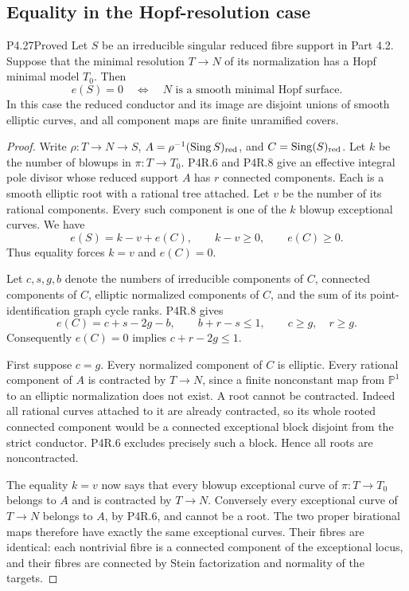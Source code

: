 \subsection{Equality in the Hopf-resolution case}

\begin{statement}{P4.27}{Proved}
Let \(S\) be an irreducible singular reduced fibre support in Part 4.2.
Suppose that the minimal resolution \(T\to N\) of its normalization has a
Hopf minimal model \(T_0\). Then
\[
 e(S)=0\quad\Longleftrightarrow\quad
 N\text{ is a smooth minimal Hopf surface}.
\]
In this case the reduced conductor and its image are disjoint unions of
smooth elliptic curves, and all component maps are finite unramified covers.
\end{statement}
\begin{proof}
Write \(\rho:T\to N\to S\), \(A=\rho^{-1}(\operatorname{Sing}S)_{\rm red}\),
and \(C=\operatorname{Sing}(S)_{\rm red}\). Let \(k\) be the number of
blowups in \(\pi:T\to T_0\). P4R.6 and P4R.8 give an effective integral pole
divisor whose reduced support \(A\) has \(r\) connected components. Each is
a smooth elliptic root with a rational tree attached. Let \(v\) be the
number of its rational components. Every such component is one of the
\(k\) blowup exceptional curves. We have
\[
 e(S)=k-v+e(C),\qquad k-v\ge0,\qquad e(C)\ge0.
\]
Thus equality forces \(k=v\) and \(e(C)=0\).

Let \(c,s,g,b\) denote the numbers of irreducible components of \(C\),
connected components of \(C\), elliptic normalized components of \(C\), and
the sum of its point-identification graph cycle ranks. P4R.8 gives
\[
 e(C)=c+s-2g-b,\qquad
 b+r-s\le1,\qquad c\ge g,\quad r\ge g.
\]
Consequently \(e(C)=0\) implies \(c+r-2g\le1\).

First suppose \(c=g\). Every normalized component of \(C\) is elliptic.
Every rational component of \(A\) is contracted by \(T\to N\), since a
finite nonconstant map from \(\mathbb P^1\) to an elliptic normalization
does not exist. A root cannot be contracted. Indeed all rational curves
attached to it are already contracted, so its whole rooted connected
component would be a connected exceptional block disjoint from the strict
conductor. P4R.6 excludes precisely such a block. Hence all roots are
noncontracted.

The equality \(k=v\) now says that every blowup exceptional curve of
\(\pi:T\to T_0\) belongs to \(A\) and is contracted by \(T\to N\).
Conversely every exceptional curve of \(T\to N\) belongs to \(A\), by
P4R.6, and cannot be a root. The two proper birational maps therefore have
exactly the same exceptional curves. Their fibres are identical: each
nontrivial fibre is a connected component of the exceptional locus, and
their fibres are connected by Stein factorization and normality of the
targets.


\end{proof}
